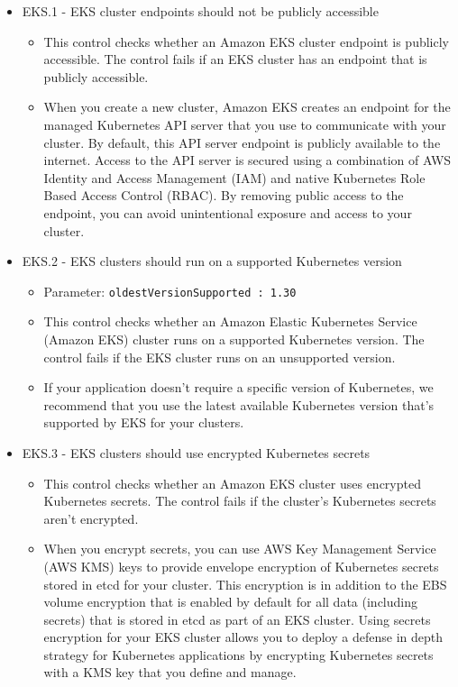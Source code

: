 \begin{mdframed}[backgroundcolor=gray!05, linecolor=gray!50]
\itshape
\begin{itemize}
    \item EKS.1 - EKS cluster endpoints should not be publicly accessible
    \begin{itemize}
        \item This control checks whether an Amazon EKS cluster endpoint is publicly accessible. The control fails if an EKS cluster has an endpoint that is publicly accessible.
        \item When you create a new cluster, Amazon EKS creates an endpoint for the managed Kubernetes API server that you use to communicate with your cluster. By default, this API server endpoint is publicly available to the internet. Access to the API server is secured using a combination of AWS Identity and Access Management (IAM) and native Kubernetes Role Based Access Control (RBAC). By removing public access to the endpoint, you can avoid unintentional exposure and access to your cluster.
    \end{itemize}
    \item EKS.2 - EKS clusters should run on a supported Kubernetes version
    \begin{itemize}
        \item Parameter: \texttt{oldestVersionSupported : 1.30}
        \item This control checks whether an Amazon Elastic Kubernetes Service (Amazon EKS) cluster runs on a supported Kubernetes version. The control fails if the EKS cluster runs on an unsupported version.
        \item If your application doesn't require a specific version of Kubernetes, we recommend that you use the latest available Kubernetes version that's supported by EKS for your clusters.
    \end{itemize}
    \item EKS.3 - EKS clusters should use encrypted Kubernetes secrets
    \begin{itemize}
        \item This control checks whether an Amazon EKS cluster uses encrypted Kubernetes secrets. The control fails if the cluster's Kubernetes secrets aren't encrypted.
        \item When you encrypt secrets, you can use AWS Key Management Service (AWS KMS) keys to provide envelope encryption of Kubernetes secrets stored in etcd for your cluster. This encryption is in addition to the EBS volume encryption that is enabled by default for all data (including secrets) that is stored in etcd as part of an EKS cluster. Using secrets encryption for your EKS cluster allows you to deploy a defense in depth strategy for Kubernetes applications by encrypting Kubernetes secrets with a KMS key that you define and manage.

\end{itemize}
\end{itemize}
\end{mdframed}
